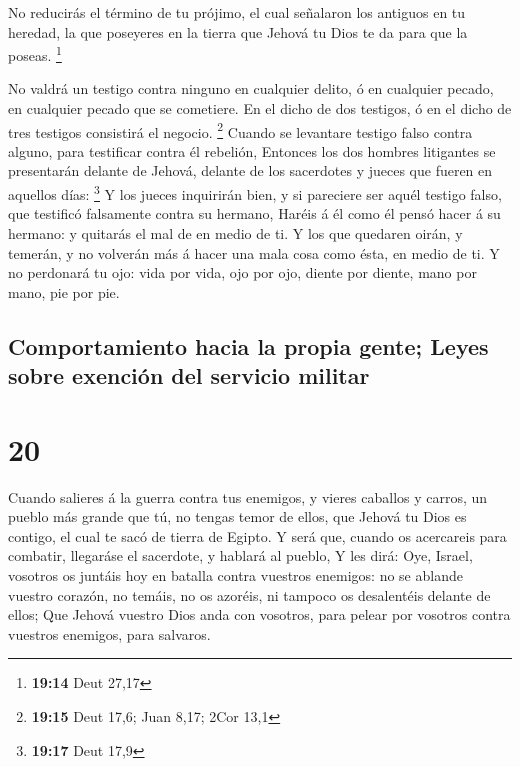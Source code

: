  No reducirás el término de tu prójimo, el cual señalaron
los antiguos en tu heredad, la que poseyeres en la tierra que Jehová tu
Dios te da para que la poseas. \footnote{\textbf{19:14} Deut 27,17}

 No valdrá un testigo contra ninguno en cualquier delito,
ó en cualquier pecado, en cualquier pecado que se cometiere. En el dicho
de dos testigos, ó en el dicho de tres testigos consistirá el negocio.
\footnote{\textbf{19:15} Deut 17,6; Juan 8,17; 2Cor 13,1}
 Cuando se levantare testigo falso contra alguno, para
testificar contra él rebelión,  Entonces los dos hombres
litigantes se presentarán delante de Jehová, delante de los sacerdotes y
jueces que fueren en aquellos días: \footnote{\textbf{19:17} Deut 17,9}
 Y los jueces inquirirán bien, y si pareciere ser aquél
testigo falso, que testificó falsamente contra su hermano,
 Haréis á él como él pensó hacer á su hermano: y quitarás
el mal de en medio de ti.  Y los que quedaren oirán, y
temerán, y no volverán más á hacer una mala cosa como ésta, en medio de
ti.  Y no perdonará tu ojo: vida por vida, ojo por ojo,
diente por diente, mano por mano, pie por pie.

\hypertarget{comportamiento-hacia-la-propia-gente-leyes-sobre-exenciuxf3n-del-servicio-militar}{%
\subsection{Comportamiento hacia la propia gente; Leyes sobre exención
del servicio
militar}\label{comportamiento-hacia-la-propia-gente-leyes-sobre-exenciuxf3n-del-servicio-militar}}

\hypertarget{section-19}{%
\section{20}\label{section-19}}

 Cuando salieres á la guerra contra tus enemigos, y vieres
caballos y carros, un pueblo más grande que tú, no tengas temor de
ellos, que Jehová tu Dios es contigo, el cual te sacó de tierra de
Egipto.  Y será que, cuando os acercareis para combatir,
llegaráse el sacerdote, y hablará al pueblo,  Y les dirá:
Oye, Israel, vosotros os juntáis hoy en batalla contra vuestros
enemigos: no se ablande vuestro corazón, no temáis, no os azoréis, ni
tampoco os desalentéis delante de ellos;  Que Jehová
vuestro Dios anda con vosotros, para pelear por vosotros contra vuestros
enemigos, para salvaros.

